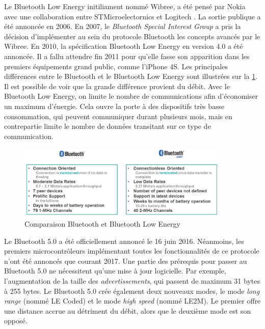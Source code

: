 Le Bluetooth Low Energy initiliament nommé Wibree, a été pensé par Nokia avec une collaboration entre STMicroelectornics et Logitech \cite{Bluetoot45:online}. La sortie publique a été annoncée en 2006. En 2007, le \textit{Bluetooth Special Interest Group} a pris la décision d'implémenter au sein du protocole Bluetooth les concepts avancés par le Wibree. En 2010, la spécification Bluetooth Low Energy en version 4.0 a été annoncée. Il a fallu attendre fin 2011 pour qu'elle fasse son apparition dans les premiers équipements grand public, comme l'iPhone 4S. Les principales différences entre le Bluetooth et le Bluetooth Low Energy sont illustrées sur la \cref{fig-bluetooth_vs_ble}. Il est possible de voir que la grande différence provient du débit. Avec le Bluetooth Low Energy, on limite le nombre de communications afin d'économiser un maximum d'énergie. Cela ouvre la porte à des dispositifs très basse consommation, qui peuvent communiquer durant plusieurs mois, mais en contrepartie limite le nombre de données transitant sur ce type de communication.

\begin{figure}[ht!]
    \centering
    \includegraphics[width=0.9\textwidth]{Figures/Protocols/Bluetooth/bluetooth_vs_ble.PNG}
    \caption{Comparaison Bluetooth et Bluetooth Low Energy}
    \label{fig-bluetooth_vs_ble}
\end{figure}

Le Bluetooth 5.0 a été officiellement annoncé le 16 juin 2016. Néanmoins, les premiers microcontrôleurs implémentant toutes les fonctionnalités de ce protocole n'ont été annoncés que courant 2017. Une partie des prérequis pour passer au Bluetooth 5.0 ne nécessitent qu'une mise à jour logicielle. Par exemple, l'augmentation de la taille des \textit{advertissements}, qui passent de maximum 31 bytes à 255 bytes. Le Bluetooth 5.0 crée également deux nouveaux modes, le mode \textit{long range} (nommé LE Coded) et le mode \textit{high speed} (nommé LE2M)\cite{Explorin32:online}. Le premier offre une distance accrue au détriment du débit, alors que le deuxième mode est son opposé.\\

